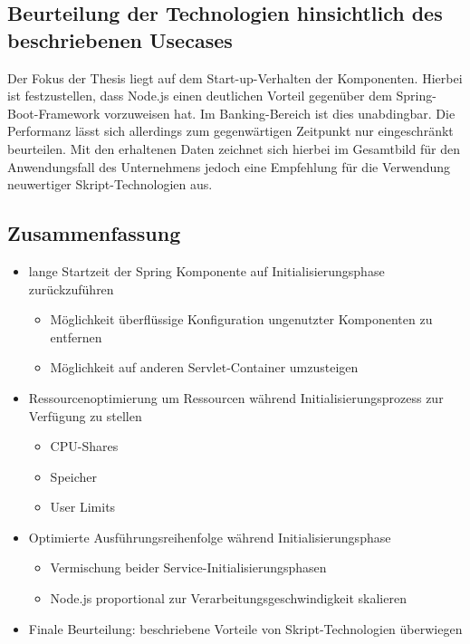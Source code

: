 \subsection{Beurteilung der Technologien hinsichtlich des beschriebenen Usecases}
Der Fokus der Thesis liegt auf dem Start-up-Verhalten der Komponenten. Hierbei ist festzustellen, dass Node.js einen deutlichen Vorteil gegenüber dem Spring-Boot-Framework vorzuweisen hat. Im Banking-Bereich ist dies unabdingbar. Die Performanz lässt sich allerdings zum gegenwärtigen Zeitpunkt nur eingeschränkt beurteilen. Mit den erhaltenen Daten zeichnet sich hierbei im Gesamtbild für den Anwendungsfall des Unternehmens jedoch eine Empfehlung für die Verwendung neuwertiger Skript-Technologien aus. 


\subsection{Zusammenfassung}


\begin{itemize}
	\item lange Startzeit der Spring Komponente auf Initialisierungsphase zurückzuführen
	\begin{itemize}
		\item Möglichkeit überflüssige Konfiguration ungenutzter Komponenten zu entfernen
		\item Möglichkeit auf anderen Servlet-Container umzusteigen
	\end{itemize}
	\item Ressourcenoptimierung um Ressourcen während Initialisierungsprozess zur Verfügung zu stellen
	\begin{itemize}
		\item CPU-Shares
		\item Speicher
		\item User Limits
	\end{itemize}
	\item Optimierte Ausführungsreihenfolge während Initialisierungsphase
	\begin{itemize}
		\item Vermischung beider Service-Initialisierungsphasen
		\item Node.js proportional zur Verarbeitungsgeschwindigkeit skalieren
	\end{itemize}
	\item Finale Beurteilung: beschriebene Vorteile von Skript-Technologien überwiegen
\end{itemize}
